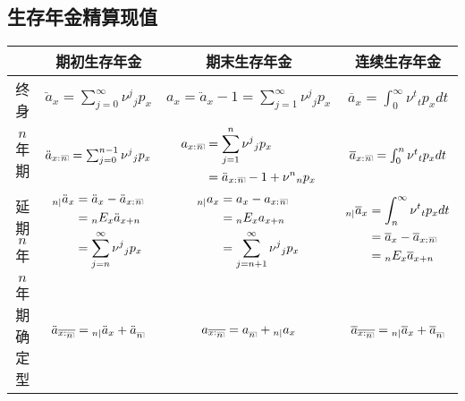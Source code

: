 \documentclass[lang=cn,10pt]{elegantbook}
\makeatletter
\DeclareRobustCommand{\annu}[1]{_{%
    \def\arraystretch{0}%
    \setlength\arraycolsep{1pt}%
    \setlength\arrayrulewidth{.2pt}%
    \begin{array}[b]{@{}c|}\hline
        \\[\arraycolsep]%
        \scriptstyle #1%
    \end{array}%
}}
\makeatother
\begin{document}
\subsection{生存年金精算现值}
\begin{center}
    \begin{tabular}{ c|c|c|c }
        \hline
        $ $ & 期初生存年金& 期末生存年金      & 连续生存年金   \\
         \hline
        终身& $\ddot a_x=\sum_{j=0}^{\infty}{\nu^j{}_jp_x}$ & $a_{x}=\ddot a_{x}-1=\sum^{\infty}_{j=1}\nu^{j}{}_jp_x$      & $\overline{a}_{x}=\int_0^{\infty} \nu^t{}_{t}p_xdt$           \\
        \hline
          $n$年期& $\ddot a_{x:}{}{\annu n}=\sum_{j=0}^{n-1}{\nu^j}{}_j p_x$ & $ \begin{aligned}
          a_{x:}{}\annu n&=\sum^{n}_{j=1}\nu^{j}{}_jp_x\\
          &=\ddot a_{x:}{}\annu n-1+\nu^{n}{}_{n}p_x
          \end{aligned}$ & $  \overline{a}_{x:}{}\annu{n}=\int_0^{n} \nu^t{}_{t}p_xdt$  \\
           \hline
          延期$n$年& $\begin{aligned}
          _{n|}\ddot a_{x}&=\ddot a_{x}-\ddot a_{x:}{}\annu n\\
          &={}_{n}E_{x}\ddot a_{x+n}\\
          &=\sum^{\infty}_{j=n}\nu^{j}{}_{j}p_{x}\\
          \end{aligned}$ & $\begin{aligned}
 _{n|}a_{x}& = a_{x}-a_{x:}{}\annu n \\
& = {}_{n}E_{x}a_{x+n}\\
&=\sum_{j=n+1}^{\infty}\nu^{j}{}_{j}p_{x}
\end{aligned}$ & $\begin{aligned}
          {}_{n|}\overline{a}_{x}&=\int_n^{\infty} \nu^t{}_{t}p_xdt\\
          &=\overline{a}_{x}-\overline{a}_{x:}{}\annu{n}\\
          &={}_nE_x\overline{a}_{x+n}
          \end{aligned}$ \\
           \hline
          $n$年期确定型& $\ddot a_{\overline{x:\annu n}}={}_{n|}\ddot a_{x}+\ddot a_{\annu n}$ & $a_{\overline{x:\annu{n}}}=a_{\annu n} + {}_{n|}a_{x}$ & $\overline a_{\overline{x:\annu{n}}}={}_{n|}\overline{a}_{x}+\overline a_{\annu {n}}$ \\
        \hline
    \end{tabular}
\end{center}
\end{document}
